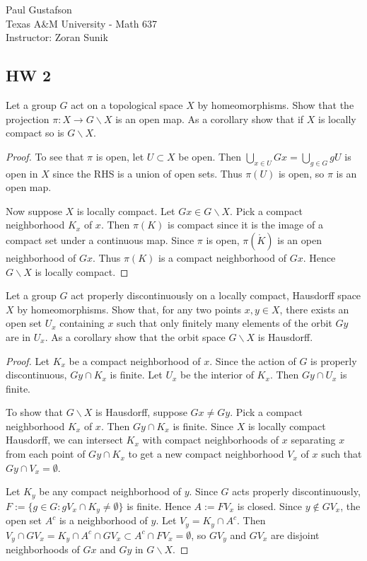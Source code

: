 \documentclass{article}
\begin{document}
\noindent Paul Gustafson\\
\noindent Texas A\&M University - Math 637\\ 
\noindent Instructor: Zoran Sunik

\subsection*{HW 2}
 Let a group $G$ act on a topological space $X$ by homeomorphisms.  Show that the projection $\pi: X \to G \backslash X$ is an open map.
 As a corollary show that  if $X$ is locally compact so is $G \backslash X$.
\begin{proof}
To see that $\pi$ is open, let $U \subset X$ be open.  Then $\bigcup_{x \in U} Gx = \bigcup_{g \in G} gU$ is open in $X$ since the RHS is a union of open sets.  Thus $\pi(U)$ is open, so $\pi$ is an open map.

Now suppose $X$ is locally compact.  Let $Gx \in G \backslash X$.  Pick a compact neighborhood $K_x$ of $x$.  Then $\pi(K)$ is compact since it is the image of a compact set under a continuous map.  Since $\pi$ is open, $\pi(\mathring{K})$ is an open neighborhood of $Gx$. Thus $\pi(K)$ is a compact neighborhood of $Gx$. Hence $G \backslash X$ is locally compact.
\end{proof}

 Let a group $G$ act properly discontinuously on a locally compact, Hausdorff space $X$ by homeomorphisms.  Show that, for any two points $x, y \in X$, there exists an open set $U_x$ containing $x$ such that only finitely many elements of the orbit $Gy$ are in $U_x$.
As a corollary show that the orbit space $G \backslash X$ is Hausdorff.
\begin{proof}
Let $K_x$ be a compact neighborhood of $x$.   Since the action of $G$ is properly discontinuous, $Gy \cap K_x$ is finite.  Let $U_x$ be the interior of $K_x$.  Then $Gy \cap U_x$ is finite.

To show that $G \backslash X$ is Hausdorff, suppose $Gx \neq Gy$. Pick a compact neighborhood $K_x$ of $x$.  Then $Gy \cap K_x$ is finite.  Since $X$ is locally compact Hausdorff, we can intersect $K_x$ with compact neighborhoods of $x$ separating $x$ from each point of $Gy \cap K_x$ to get a new compact neighborhood $V_x$ of $x$ such that $Gy \cap V_x = \emptyset$. 

Let $K_y$ be any compact neighborhood of $y$.  Since $G$ acts properly discontinuously, $F := \{g \in G : gV_x \cap K_y \neq \emptyset \}$ is finite. Hence $A := FV_x$ is closed.  Since $y \not\in GV_x$, the open set $A^c$ is a neighborhood of $y$. Let $V_y = K_y \cap A^c$.  Then $V_y \cap GV_x = K_y \cap A^c \cap GV_x \subset A^c \cap FV_x = \emptyset$, so $GV_y$ and $GV_x$ are disjoint neighborhoods of $Gx$ and $Gy$ in $G \backslash X$.
\end{proof}
\end{document}
